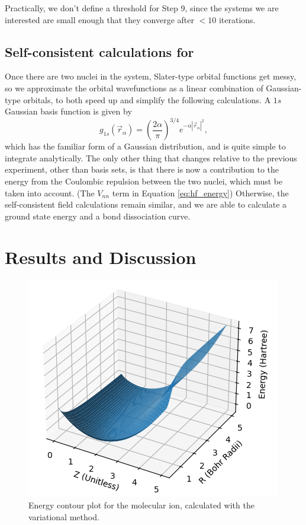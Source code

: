 \documentclass{achemso}
\begin{document}
Practically, we don't define a threshold for Step 9, since the systems we are interested are small enough that they converge after $<10$ iterations. 


\subsection{Self-consistent calculations for }
Once there are two nuclei in the system, Slater-type orbital functions get messy, so we approximate the orbital wavefunctions as a linear combination of Gaussian-type orbitals, to both speed up and simplify the following calculations.  A $1s$ Gaussian basis function is given by
\begin{equation}
	g_{1s}(\vec{r}_\alpha)=\left(\frac{2\alpha}{\pi}\right)^{3/4}e^{-\alpha|\vec{r}_\alpha|^2},
\end{equation}
which has the familiar form of a Gaussian distribution, and is quite simple to integrate analytically.  The only other thing that changes relative to the previous experiment, other than basis sets, is that there is now a contribution to the energy from the Coulombic repulsion between the two nuclei, which must be taken into account. (The $V_{nn}$ term in Equation \ref{eq:hf_energy})  Otherwise, the self-consistent field calculations remain similar, and we are able to calculate a ground state energy and a bond dissociation curve.
\section{Results and Discussion}
\begin{figure}[H]
  \includegraphics[width=.5\textwidth]{figures/variational_energy_contour.png}
  \caption{Energy contour plot for the  molecular ion, calculated with the variational method.}
\end{figure}
\end{document}
